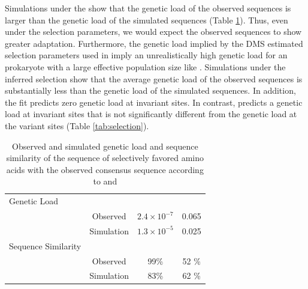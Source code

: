 \documentclass[fleqn,letterpaper]{article}
\begin{document}
Simulations under the \phydms show that the genetic load of the observed sequences is larger than the genetic load of the simulated sequences (Table \ref{tab:gl_ss}).
Thus, even under the \phydms selection parameters, we would expect the observed sequences to show greater adaptation.
Furthermore, the genetic load implied by the DMS estimated selection parameters used in \phydms imply an unrealistically high genetic load for an prokaryote with a large effective population size like \ecoli.
Simulations under the \selac inferred selection show that the average genetic load of the observed sequences is substantially less than the genetic load of the simulated sequences. 
In addition, the \selac fit predicts zero genetic load at invariant sites.
In contrast, \phydms predicts a genetic load at invariant sites that is not significantly different from the genetic load at the variant sites (Table \ref{tab:selection}).

\begin{table}
  \centering
  \caption{Observed and simulated genetic load and sequence similarity of the sequence of selectively favored amino acids with the observed consensus sequence according to \selac and \phydms}
  \begin{tabular}{lccc}
    \hline
							& 				& \selac 				& \phydms \\ \hline 
	Genetic Load		 	& 				& 						&		\\
   							&Observed		&$2.4\times 10^{-7}$	& 0.065 \\
    							&Simulation	&$1.3 \times 10^{-5}$ & 0.025 \\
	Sequence Similarity 	& 				& 						&		\\
   							&Observed		&  	99\%				& 52 \% \\
    							&Simulation	&	83\%				& 62 \% \\ \hline
  \end{tabular}
  \label{tab:gl_ss}
\end{table}
\end{document}
